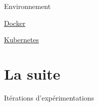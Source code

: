 \documentclass[aspectratio=169,10pt,xcolor=x11names,english,french]{beamer}
\begin{document}
	\begin{frame}{Environnement}
			\begin{minipage}{0.49\linewidth}
				\centering
				 \vfil
				\vspace{1em}
				\href{https://www.docker.com/}{Docker}
			\end{minipage}
			\begin{minipage}{0.49\linewidth}
				\centering
				 \vfil
				\vspace{1em}
				\href{https://kubernetes.io/fr/}{Kubernetes}
			\end{minipage}
			\note{}
	\end{frame}
		
	\section{La suite}
	\begin{frame}
		\centering
		\fontsize{35}{35}\faRefresh\vfil
		\vspace{1em}
		\normalsize Itérations d'expérimentations
	\end{frame}
	
\end{document}
